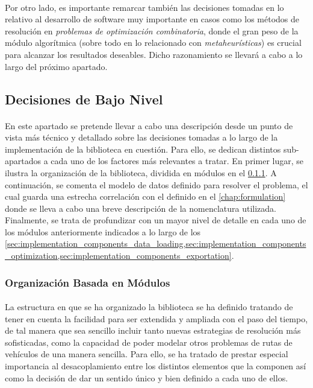 \documentclass{subfiles}
\begin{document}
        \paragraph{}
        Por otro lado, es importante remarcar también las decisiones tomadas en lo relativo al desarrollo de software muy importante en casos como los métodos de resolución en \emph{problemas de optimización combinatoria}, donde el gran peso de la módulo algorítmica (sobre todo en lo relacionado con \emph{metaheurísticas}) es crucial para alcanzar los resultados deseables. Dicho razonamiento se llevará a cabo a lo largo del próximo apartado.
      
      \subsection{Decisiones de Bajo Nivel}
      \label{sec:implementation_low_level}

        \paragraph{}
        En este apartado se pretende llevar a cabo una descripción desde un punto de vista más técnico y detallado sobre las decisiones tomadas a lo largo de la implementación de la biblioteca en cuestión. Para ello, se dedican distintos sub-apartados a cada uno de los factores más relevantes a tratar. En primer lugar, se ilustra la organización de la biblioteca, dividida en módulos en el \cref{sec:implementation_components}. A continuación, se comenta el modelo de datos definido para resolver el problema, el cual guarda una estrecha correlación con el definido en el \cref{chap:formulation} donde se lleva a cabo una breve descripción de la nomenclatura utilizada. Finalmente, se trata de profundizar con un mayor nivel de detalle en cada uno de los módulos anteriormente indicados a lo largo de los \cref{sec:implementation_components_data_loading,sec:implementation_components_optimization,sec:implementation_components_exportation}.

        \subsubsection{Organización Basada en Módulos}
        \label{sec:implementation_components}

          \paragraph{}
          La estructura en que se ha organizado la biblioteca se ha definido tratando de tener en cuenta la facilidad para ser extendida y ampliada con el paso del tiempo, de tal manera que sea sencillo incluir tanto nuevas estrategias de resolución más sofisticadas, como la capacidad de poder modelar otros problemas de rutas de vehículos de una manera sencilla. Para ello, se ha tratado de prestar especial importancia al desacoplamiento entre los distintos elementos que la componen así como la decisión de dar un sentido único y bien definido a cada uno de ellos. 
\end{document}
